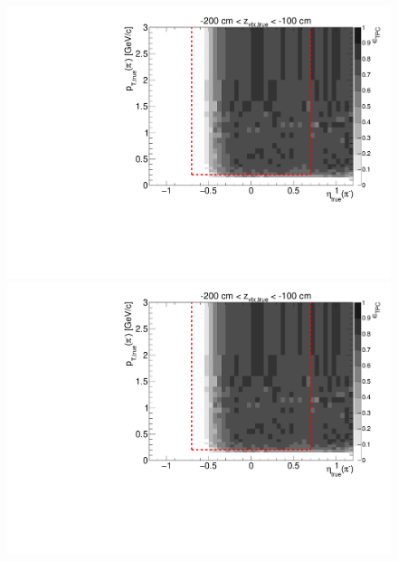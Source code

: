 \begin{figure}[hb]
{  \includegraphics[width=\linewidth,page=16]{graphics/eff/Eff2D_TPC_pion_Minus.pdf}\\
  \includegraphics[width=\linewidth,page=18]{graphics/eff/Eff2D_TPC_pion_Minus.pdf}
}%
\end{figure}

